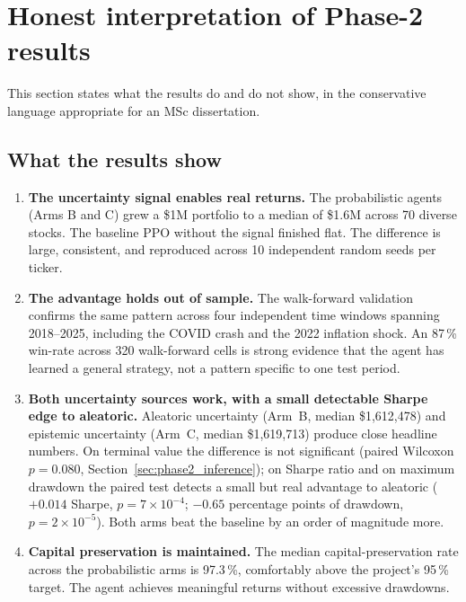 \section{Honest interpretation of Phase-2 results}
\label{sec:phase2_interpretation}

This section states what the results do and do not show, in the conservative language appropriate for an MSc dissertation.

\subsection{What the results show}

\begin{enumerate}
  \item \textbf{The uncertainty signal enables real returns.} The probabilistic agents (Arms B and C) grew a \$1M portfolio to a median of \$1.6M across 70 diverse stocks. The baseline PPO without the signal finished flat. The difference is large, consistent, and reproduced across 10 independent random seeds per ticker.

  \item \textbf{The advantage holds out of sample.} The walk-forward validation confirms the same pattern across four independent time windows spanning 2018--2025, including the COVID crash and the 2022 inflation shock. An 87\,\% win-rate across 320 walk-forward cells is strong evidence that the agent has learned a general strategy, not a pattern specific to one test period.

  \item \textbf{Both uncertainty sources work, with a small detectable Sharpe edge to aleatoric.} Aleatoric uncertainty (Arm~B, median \$1,612,478) and epistemic uncertainty (Arm~C, median \$1,619,713) produce close headline numbers. On terminal value the difference is not significant (paired Wilcoxon $p = 0.080$, Section~\ref{sec:phase2_inference}); on Sharpe ratio and on maximum drawdown the paired test detects a small but real advantage to aleatoric ($+0.014$ Sharpe, $p = 7 \times 10^{-4}$; $-0.65$ percentage points of drawdown, $p = 2 \times 10^{-5}$). Both arms beat the baseline by an order of magnitude more.

  \item \textbf{Capital preservation is maintained.} The median capital-preservation rate across the probabilistic arms is 97.3\,\%, comfortably above the project's 95\,\% target. The agent achieves meaningful returns without excessive drawdowns.


\end{enumerate}
